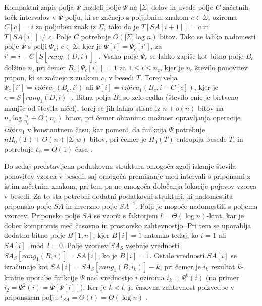 Kompaktni zapis polja $\Psi$ razdeli polje $\Psi$ na $|\Sigma|$ delov in uvede polje $C$ začetnih točk intervalov v $\Psi$ polju, ki se začnejo s poljubnim znakom $c\in\Sigma$, oziroma $C[c]=i$ za poljuben znak iz $\Sigma$, tako da je $T[SA[i+1]]=c$ in $T[SA[i]]\ne c$. Polje $C$ potrebuje $O(|\Sigma|\log{n})$ bitov. Tako se lahko nadomesti polje $\Psi$ s polji $\Psi_c;\:c\in\Sigma$, kjer je $\Psi[i]=\Psi_c[i']$, za $i'=i-C[S[rang_1(D,i)]]$. Vsako polje $\Psi_c$ se lahko zapiše kot bitno polje $B_c$ dolžine $n$, pri čemer $B_c[\Psi_c[i]]=1$ za $1 \le i \le n_c$, kjer je $n_c$ število ponovitev pripon, ki se začnejo z znakom $c$, v besedi $T$. Torej velja $\Psi_c[i']=izbira_1(B_c,i')$ ali $\Psi[i]=izbira_1(B_c,i-C[c])$, kjer je $c=S[rang_1(D,i)]$. Bitna polja $B_c$ so zelo redka (število enic je bistveno manjše od števila ničel), torej se jih lahko stisne iz $n+o(n)$ bitov na $n_c\log\frac{n}{n_c}+O(n_c)$ bitov, pri čemer ohranimo možnost opravljanja operacije $\textit{izbira}_1$ v konstantnem času, kar pomeni, da funkcija $\Psi$ potrebuje $nH_0(T)+O(n+|\Sigma|w)$ bitov, pri čemer je $H_0(T)$ entropija besede $T$, in potrebuje $t_\psi=O(1)$ časa \cite{Navarro2016}.

Do sedaj predstavljena podatkovna struktura omogoča zgolj iskanje števila ponovitev vzorca v besedi, saj omogoča premikanje med intervali s priponami z istim začetnim znakom, pri tem pa ne omogoča določanja lokacije pojavov vzorca v besedi. Za to sta potrebni dodatni podatkovni strukturi, ki nadomestita priponsko polje $SA$ in inverzno polje $SA^{-1}$. Polji je mogoče nadomestiti s poljema vzorcev. Priponsko polje $SA$ se vzorči s faktorjem $l=\Theta(\log{n})$-krat, kar je dober kompromis med časovno in prostorsko zahtevnostjo. Pri tem se uporablja dodatno bitno polje $B[1,n]$, kjer $B[i]=1$ natanko tedaj, ko $i=1$ ali $SA[i]\mod{l} =0$. Polje vzorcev $SA_S$ vsebuje vrednosti $SA_S[rang_1(B,i)]=SA[i]$, ko je $B[i]=1$. Ostale vrednosti $SA[i]$ se izračunajo kot $SA[i]=SA_S[rang_1(B,i_k)]-k$, pri čemer je $i_k$ rezultat $k$-kratne uporabe funkcije $\Psi$ nad vrednostjo $i$ oziroma $i_k=\Psi^k(i)$ (na primer $i_2=\Psi^2(i)=\Psi[\Psi[i]]$). Ker je $k< l$, je časovna zahtevnost poizvedbe v priponskem polju $t_{SA}=O(l)=O(\log{n})$ \cite{Navarro2016}.

